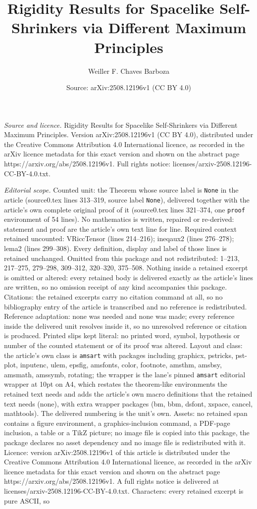 \documentclass[10pt,a4paper]{amsart}
\title[Rigidity Results for Spacelike Self-Shrinkers via Different ]{Rigidity Results for Spacelike Self-Shrinkers via Different Maximum Principles}
\author{Weiller F. Chaves Barboza}
\date{Source: arXiv:2508.12196v1 (CC BY 4.0)}
\begin{document}
\maketitle

\noindent\emph{Source and licence.} Rigidity Results for Spacelike Self-Shrinkers via Different Maximum Principles. Version arXiv:2508.12196v1 (CC BY 4.0), distributed under the Creative Commons Attribution 4.0 International licence, as recorded in the arXiv licence metadata for this exact version and shown on the abstract page https://arxiv.org/abs/2508.12196v1. Full rights notice: licenses/arxiv-2508.12196-CC-BY-4.0.txt.\par\smallskip

\noindent\textit{Editorial scope.} Counted unit: the Theorem whose source label is \texttt{None} in the article (source0.tex lines 313--319, source label \texttt{None}), delivered together with the article's own complete original proof of it (source0.tex lines 321--374, one \texttt{proof} environment of 54 lines). No mathematics is written, repaired or re-derived: statement and proof are the article's own text line for line. Required context retained uncounted: VRiccTensor (lines 214--216); ineqaux2 (lines 276--278); lema2 (lines 299--308). Every definition, display and label of those lines is retained unchanged. Omitted from this package and not redistributed: 1--213, 217--275, 279--298, 309--312, 320--320, 375--508. Nothing inside a retained excerpt is omitted or altered: every retained body is delivered exactly as the article's lines are written, so no omission receipt of any kind accompanies this package. Citations: the retained excerpts carry no citation command at all, so no bibliography entry of the article is transcribed and no reference is redistributed. Reference adaptation: none was needed and none was made; every reference inside the delivered unit resolves inside it, so no unresolved reference or citation is produced. Printed slips kept literal: no printed word, symbol, hypothesis or number of the counted statement or of its proof was altered. Layout and class: the article's own class is \texttt{amsart} with packages including graphicx, pstricks, pst-plot, inputenc, ulem, epsfig, amsfonts, color, footnote, amsthm, amsbsy, amsmath, amssymb, rotating; the wrapper is the lane's pinned \texttt{amsart} editorial wrapper at 10pt on A4, which restates the theorem-like environments the retained text needs and adds the article's own macro definitions that the retained text needs (none), with extra wrapper packages (bm, bbm, dsfont, xspace, cancel, mathtools). The delivered numbering is the unit's own. Assets: no retained span contains a figure environment, a graphics-inclusion command, a PDF-page inclusion, a table or a TikZ picture; no image file is copied into this package, the package declares no asset dependency and no image file is redistributed with it. Licence: version arXiv:2508.12196v1 of this article is distributed under the Creative Commons Attribution 4.0 International licence, as recorded in the arXiv licence metadata for this exact version and shown on the abstract page https://arxiv.org/abs/2508.12196v1. A full rights notice is delivered at licenses/arxiv-2508.12196-CC-BY-4.0.txt. Characters: every retained excerpt is pure ASCII, so 
\end{document}

